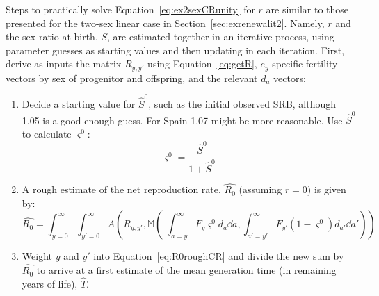 
 \FloatBarrier
\label{sec:ex2sexCRit}
Steps to practically solve Equation~\eqref{eq:ex2sexCRunity} for $r$ are
similar to those presented for the two-sex linear case in
Section~\ref{sec:exrenewalit2}. Namely, $r$ and the sex ratio at birth, $S$, are
estimated together in an iterative process, using parameter guesses as starting
values and then updating in each iteration. First, derive as inputs the matrix
$R_{y,y'}$ using Equation~\eqref{eq:getR}, $e_y$-specific fertility vectors by
sex of progenitor and offspring, and the relevant $d_a$ vectors:
\begin{enumerate}
  \item Decide a starting value for $\hat{S}^0$, such as the initial observed SRB,
although 1.05 is a good enough guess. For Spain 1.07 might be more
reasonable. Use $\hat{S}^0$ to calculate $\varsigma^0$:
\begin{equation}
\label{eq:getvarsigma}
\varsigma^0 = \frac{\hat{S}^0}{1+\hat{S}^0}
\end{equation}
  \item A rough estimate of the net reproduction rate, $\widehat{R_0}$ (assuming
  $r=0$) is given by:
 \begin{equation}
 \label{eq:R0roughCR}
 \widehat{R_0} = \int_{y=0}^\infty \int_{y'=0}^\infty
A\left(R_{y,y'},\mathbb{M}\left(\;\int_{a=y}^\infty F_y \varsigma^0 d_a \dd a,
\int _{a'=y'}^\infty F_{y'} (1-\varsigma^0) d_{a'} \dd a'\right)\right)
 \end{equation}
  \item Weight $y$ and $y'$ into Equation~\eqref{eq:R0roughCR} and divide the
  new sum by $\widehat{R_0}$ to arrive at a first estimate of the mean
  generation time (in remaining years of life), $\widehat{T}$.


\end{enumerate}
